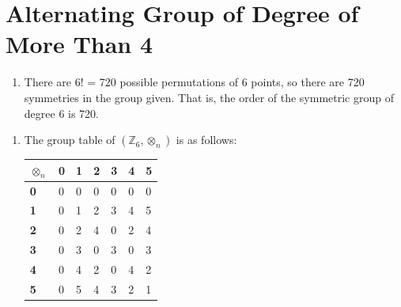 \section{Alternating Group of Degree of More Than 4}


\begin{enumerate}
    \item There are 6! = 720 possible permutations of 6 points, so there are 720 symmetries in the group given. That is, the order of the symmetric group of degree 6 is 720.
\end{enumerate}

\begin{enumerate}
    \item The group table of $(\mathbb{Z}_6, \otimes_n)$ is as follows:

    \begin{table}[h]
        \centering
        \begin{tabular}{|l|l|l|l|l|l|l|}
        \hline
        \textbf{$\otimes_n$} & \textbf{0} & \textbf{1} & \textbf{2} & \textbf{3} & \textbf{4} & \textbf{5} \\ \hline
        \textbf{0}       & 0          & 0          & 0          & 0          & 0          & 0          \\ \hline
        \textbf{1}       & 0          & 1          & 2          & 3          & 4          & 5          \\ \hline
        \textbf{2}       & 0          & 2          & 4          & 0          & 2          & 4          \\ \hline
        \textbf{3}       & 0          & 3          & 0          & 3          & 0          & 3          \\ \hline
        \textbf{4}       & 0          & 4          & 2          & 0          & 4          & 2          \\ \hline
        \textbf{5}       & 0          & 5          & 4          & 3          & 2          & 1          \\ \hline
        \end{tabular}
    \end{table}


\end{enumerate}
